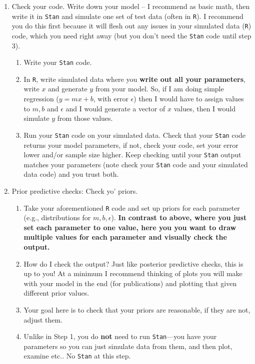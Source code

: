 \documentclass[11pt]{article}
\begin{document}
\begin{enumerate}
\item Check your code. Write down your model -- I recommend as basic math, then write it in \verb|Stan| and simulate one set of test data (often in \verb|R|). I recommend you do this first because it will flesh out any issues in your simulated data (\verb|R|) code, which you need right away (but you don't need the \verb|Stan| code until step 3).
\begin{enumerate}
\item Write your \verb|Stan| code.
\item In \verb|R|, write simulated data where you {\bf write out all your parameters}, write $x$ and generate $y$ from your model. So, if I am doing simple regression ($y=mx+b$, with error $\epsilon$) then I would have to assign values to $m, b$ and $\epsilon$ and I would generate a vector of $x$ values, then I would simulate $y$ from those values.
\item Run your \verb|Stan| code on your simulated data. Check that your \verb|Stan| code returns your model parameters, if not, check your code, set your error lower and/or sample size higher. Keep checking until your \verb|Stan| output matches your parameters (note check your \verb|Stan| code and your simulated data code) and you trust both.
\end{enumerate}
\item Prior predictive checks: Check yo' priors.
\begin{enumerate}
\item Take your aforementioned \verb|R| code and set up priors for each parameter (e.g., distributions for $m, b, \epsilon$). {\bf In contrast to above, where you just set each parameter to one value, here you you want to draw multiple values for each parameter and visually check the output.} 
\item How do I check the output? Just like posterior predictive checks, this is up to you! At a minimum I recommend thinking of plots you will make with your model in the end (for publications) and plotting that given different prior values.
\item Your goal here is to check that your priors are reasonable, if they are not, adjust them. 
\item Unlike in Step 1, you do {\bf not} need to run \verb|Stan|---you have your parameters so you can just simulate data from them, and then plot, examine etc.. No \verb|Stan| at this step. 
\end{enumerate}

\end{enumerate}
\end{document}
